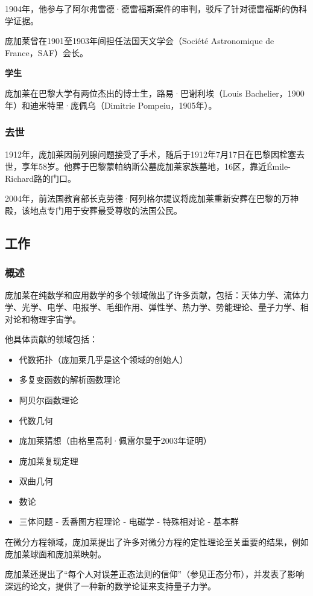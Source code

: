 1904年，他参与了阿尔弗雷德·德雷福斯案件的审判，驳斥了针对德雷福斯的伪科学证据。

庞加莱曾在1901至1903年间担任法国天文学会（Société Astronomique de France，SAF）会长。

\textbf{学生}

庞加莱在巴黎大学有两位杰出的博士生，路易·巴谢利埃（Louis Bachelier，1900年）和迪米特里·庞佩乌（Dimitrie Pompeiu，1905年）。

\subsubsection{去世}
1912年，庞加莱因前列腺问题接受了手术，随后于1912年7月17日在巴黎因栓塞去世，享年58岁。他葬于巴黎蒙帕纳斯公墓庞加莱家族墓地，16区，靠近Émile-Richard路的门口。

2004年，前法国教育部长克劳德·阿列格尔提议将庞加莱重新安葬在巴黎的万神殿，该地点专门用于安葬最受尊敬的法国公民。
\subsection{工作}
\subsubsection{概述}
庞加莱在纯数学和应用数学的多个领域做出了许多贡献，包括：天体力学、流体力学、光学、电学、电报学、毛细作用、弹性学、热力学、势能理论、量子力学、相对论和物理宇宙学。

他具体贡献的领域包括：
\begin{itemize}
\item 代数拓扑（庞加莱几乎是这个领域的创始人）
\item 多复变函数的解析函数理论
\item 阿贝尔函数理论
\item 代数几何
\item 庞加莱猜想（由格里高利·佩雷尔曼于2003年证明）
\item 庞加莱复现定理
\item 双曲几何
\item 数论
\item 三体问题
- 丢番图方程理论
- 电磁学
- 特殊相对论
- 基本群

\end{itemize}
在微分方程领域，庞加莱提出了许多对微分方程的定性理论至关重要的结果，例如庞加莱球面和庞加莱映射。

庞加莱还提出了“每个人对误差正态法则的信仰”（参见正态分布），并发表了影响深远的论文，提供了一种新的数学论证来支持量子力学。